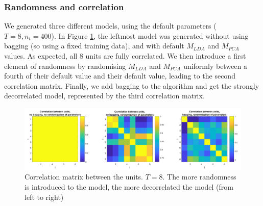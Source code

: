 \documentclass[10pt,technote]{IEEEtran}
\begin{document}
\subsubsection{Randomness and correlation}
We generated three different models, using the default parameters ($T = 8, n_t = 400$). In Figure \ref{fig:corrs}, the leftmost model was generated without using bagging (so using a fixed training data), and with default $M_{LDA}$ and $M_{PCA}$ values. As expected, all 8 units are fully correlated. We then introduce a first element of randomness by randomising $M_{LDA}$ and $M_{PCA}$ uniformly between a fourth of their default value and their default value, leading to the second correlation matrix. Finally, we add bagging to the algorithm and get the strongly decorrelated model, represented by the third correlation matrix. 

\begin{figure}[htb!]
    \centering
    \includegraphics[width=\linewidth]{../results/ex2LDAEnsemble/correlation.png}
    \caption{Correlation matrix between the units. $T = 8$. The more randomness is introduced to the model, the more decorrelated the model (from left to right)}
    \label{fig:corrs}
\end{figure}


%
%
\end{document}
